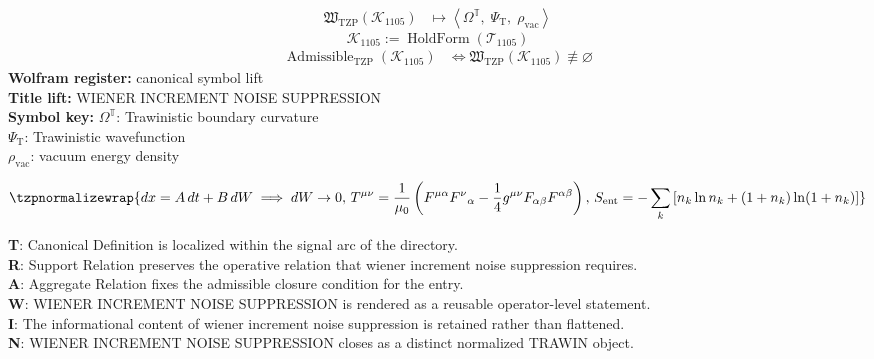 \noindent
\begin{minipage}[t]{0.48\linewidth}
\begingroup
\small
\[
\begin{aligned}
\mathfrak{W}_{\mathrm{TZP}}\!\left(\mathcal{K}_{1105}\right)
&\longmapsto
\left\langle \Omega^{\mathbb{T}},\; \Psi_{\mathrm{T}},\; \rho_{\mathrm{vac}} \right\rangle
\end{aligned}
\]
\[
\mathcal{K}_{1105}
:=
\operatorname{HoldForm}\!\left(\mathcal{T}_{1105}\right)
\]
\[
\begin{aligned}
\operatorname{Admissible}_{\mathrm{TZP}}\!\left(\mathcal{K}_{1105}\right)
&\Longleftrightarrow
\mathfrak{W}_{\mathrm{TZP}}\!\left(\mathcal{K}_{1105}\right)\not\equiv\varnothing
\end{aligned}
\]
\textbf{Wolfram register:} canonical symbol lift\\
\textbf{Title lift:} WIENER INCREMENT NOISE SUPPRESSION\\
\textbf{Symbol key:} \(\Omega^{\mathbb{T}}\): Trawinistic boundary curvature\\ \(\Psi_{\mathrm{T}}\): Trawinistic wavefunction\\ \(\rho_{\mathrm{vac}}\): vacuum energy density
\par
\endgroup
\end{minipage}\hfill
\begin{minipage}[t]{0.48\linewidth}
\[
\tzpnormalizewrap{dx=A\,dt+B\,dW\implies dW\to0,\,T^{\mu\nu}=\frac{1}{\mu_0}\left(F^{\mu\alpha}F^{\nu}{}_{\alpha}-\frac{1}{4}g^{\mu\nu}F_{\alpha\beta}F^{\alpha\beta}\right),\,S_{\mathrm{ent}}=-\sum_k\left[n_k\ln n_k+(1+n_k)\ln(1+n_k)\right]}
\]

\small
\textbf{T}: Canonical Definition is localized within the signal arc of the directory.\\
\textbf{R}: Support Relation preserves the operative relation that wiener increment noise suppression requires.\\
\textbf{A}: Aggregate Relation fixes the admissible closure condition for the entry.\\
\textbf{W}: WIENER INCREMENT NOISE SUPPRESSION is rendered as a reusable operator-level statement.\\
\textbf{I}: The informational content of wiener increment noise suppression is retained rather than flattened.\\
\textbf{N}: WIENER INCREMENT NOISE SUPPRESSION closes as a distinct normalized TRAWIN object.
\normalsize
\end{minipage}


